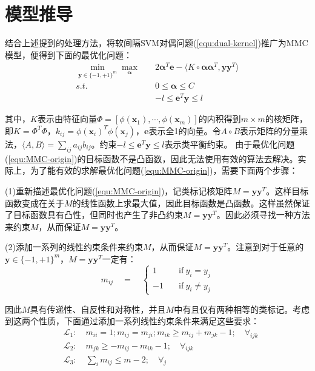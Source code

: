 \section{模型推导}
结合上述提到的处理方法，将软间隔SVM对偶问题(\ref{equ:dual-kernel})推广为MMC模型，便得到下面的最优化问题：
\begin{equation}
\begin{split} %
  \min_{\mathbf{y}\in\{-1,+1\}^m} \max_{\mathbf{\alpha}} \quad & 2\mathbf{\alpha}^T\mathbf{e} - \langle K \circ \mathbf{\alpha\alpha}^T,\mathbf{yy}^T \rangle \\
  s.t. \quad & 0\le \mathbf{\alpha} \le C \\
  & -l \le \mathbf{e}^T\mathbf{y} \le l 
  \label{equ:MMC-origin}
\end{split}
\end{equation}

其中，$K$表示由特征向量$\Phi=[\phi(\mathbf{x}_1),\cdots,\phi(\mathbf{x}_m)]$的内积得到$m\times m$的核矩阵，即$K=\Phi^T\Phi$，$k_{ij}=\phi(\mathbf{x}_i)^T\phi(\mathbf{x}_j)$，$\mathbf{e}$表示全1的向量。令$A \circ B$表示矩阵的分量乘法，$\langle A,B \rangle = \sum_{ij}a_{ij}b_{ij}$。约束$-l \le \mathbf{e}^T\mathbf{y} \le l $表示类平衡约束。
由于最优化问题(\ref{equ:MMC-origin})的目标函数不是凸函数，因此无法使用有效的算法去解决。实际上，为了能有效的求解最优化问题(\ref{equ:MMC-origin})，需要下面两个步骤：

(1)重新描述最优化问题(\ref{equ:MMC-origin})，记类标记核矩阵$M=\mathbf{yy}^T$。这样目标函数变成在关于$M$的线性函数上求最大值，因此目标函数是凸函数。这样虽然保证了目标函数具有凸性，但同时也产生了非凸约束$M=\mathbf{yy}^T$。因此必须寻找一种方法来约束$M$，从而保证$M=\mathbf{yy}^T$。

(2)添加一系列的线性约束条件来约束$M$，从而保证$M=\mathbf{yy}^T$。注意到对于任意的$\mathbf{y}\in \{-1,+1\}^m$，$M=\mathbf{yy}^T$一定有：
\begin{equation*}
m_{ij} \quad = \quad \left\{
\begin{aligned}
1 \quad & \mathrm{if}\ y_i = y_j \\
-1 \quad & \mathrm{if}\ y_i \neq y_j
\end{aligned}
\right.
\end{equation*}

因此$M$具有传递性、自反性和对称性，并且$M$中有且仅有两种相等的类标记。考虑到这两个性质，下面通过添加一系列线性约束条件来满足这些要求：
\begin{equation*}
\begin{split}
& \mathcal{L}_1:\quad m_{ii}=1;m_{ij}=m_{ji};m_{ik}\ge m_{ij}+m_{jk}-1;\quad \forall_{ijk} \\
& \mathcal{L}_2:\quad m_{jk} \ge -m_{ij} - m_{ik} - 1; \quad \forall_{ijk} \\
& \mathcal{L}_3:\quad \sum_im_{ij} \le m-2; \quad \forall_j \\
\end{split}
\end{equation*}

